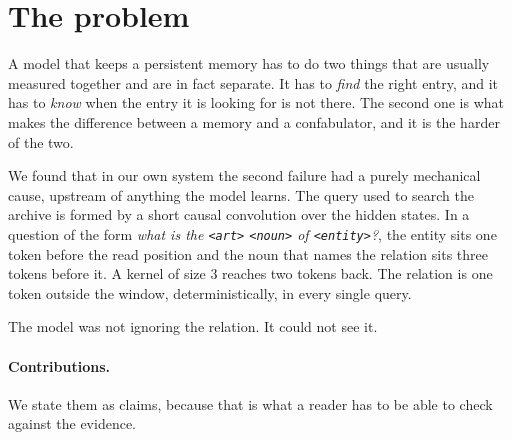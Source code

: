 \documentclass[10pt]{article}
\begin{document}
\section{The problem}

A model that keeps a persistent memory has to do two things that are usually measured together and are
in fact separate. It has to \emph{find} the right entry, and it has to \emph{know} when the entry it is
looking for is not there. The second one is what makes the difference between a memory and a
confabulator, and it is the harder of the two.

We found that in our own system the second failure had a purely mechanical cause, upstream of anything
the model learns. The query used to search the archive is formed by a short causal convolution over the
hidden states. In a question of the form \emph{what is the \texttt{<art>} \texttt{<noun>} of
\texttt{<entity>}?}, the entity sits one token before the read position and the noun that names the
relation sits three tokens before it. A kernel of size $3$ reaches two tokens back. The relation is one
token outside the window, deterministically, in every single query.

The model was not ignoring the relation. It could not see it.


\paragraph{Contributions.} We state them as claims, because that is what a reader has to be able to
check against the evidence.
\end{document}
